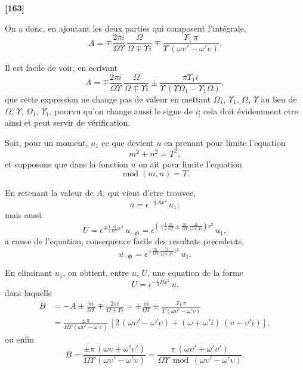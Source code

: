 \documentclass[11pt,a4paper]{article}
\DeclareMathOperator{\modd}{mod}
\begin{document}
\textbf{[163]}

On a donc, en ajoutant les deux parties qui composent l'int\'egrale,
\begin{equation}
A = \mp \frac{2\pi i}{\Omega\Upsilon}\, \frac{\Omega}{\Omega \mp \Upsilon i} \mp \frac{\Upsilon_1\, \pi}{\Upsilon\, (\omega\upsilon' - \omega'\upsilon)}. \tag{14}
\end{equation}

Il est facile de voir, en ecrivant
\[A = \mp \frac{2\pi i}{\Omega\Upsilon}\, \frac{\Omega}{\Omega \mp \Upsilon i} \pm \frac{\pi\Upsilon_1 i}{\Upsilon\, (\Upsilon\Omega_1 - \Upsilon_1\Omega)},\]
que cette expression ne change pas de valeur en mettant $\Omega_1$, $\Upsilon_1$, $\Omega$, $\Upsilon$ au lieu de
$\Omega$, $\Upsilon$, $\Omega_1$, $\Upsilon_1$, pourvu qu'on change aussi le signe de $i$; cela doit \'evidemment etre ainsi
et peut servir de v\'erification.

Soit, pour un moment, $u_1$ ce que devient $u$ en prenant pour limite l'equation
\[m^2 + n^2 = T^2,\]
et supposons que dans la fonction $u$ on ait pour limite l'equation
\[\modd(m, n) = T.\]

En retenant la valeur de $A$, qui vient d'etre trouvee,
\[u = \epsilon^{-\frac{1}{2}Ax^2}\, u_1;\]
mais aussi
\[U = \epsilon^{\mp \frac{1}{2}\frac{\pi i}{\Omega\Upsilon} x^2}\, u_{-\mathfrak{G}}
= \epsilon^{\left(\mp \frac{1}{2}\frac{\pi i}{\Omega\Upsilon} \pm \frac{\pi i}{\Omega\Upsilon}\, \frac{\Omega}{\Omega \mp \Upsilon i}\right) x^2}\, u_1,\]
a cause de l'equation, consequence facile des resultats precedents,
\[u_{-\mathfrak{G}} = \epsilon^{\pm \frac{\pi i}{\Omega\Upsilon}\, \frac{\Omega}{\Omega \mp \Upsilon i} x^2}\, u_1.\]

En eliminant $u_1$, on obtient, entre $u$, $U$, une equation de la forme
\begin{equation}
U = \epsilon^{-\frac{1}{2}Bx^2}\, u. \tag{15}
\end{equation}
dans laquelle
\begin{align*}
B &= -A \pm \frac{\pi i}{\Omega\Upsilon} \mp \frac{2\pi i}{\Omega \mp \Upsilon i}
= \pm \frac{\pi i}{\Omega\Upsilon} \pm \frac{\Upsilon_1\, \pi}{\Upsilon\, (\omega\upsilon' - \omega'\upsilon)}\\
&= \frac{\pm\pi}{\Omega\Upsilon\, (\omega\upsilon' - \omega'\upsilon)}\, [2\, (\omega\upsilon' - \omega'\upsilon) + (\omega + \omega'i)\, (\upsilon - \upsilon'i)],
\end{align*}
ou enfin
\begin{equation}
B = \frac{\pm\pi\, (\omega\upsilon + \omega'\upsilon')}{\Omega\Upsilon\, (\omega\upsilon' - \omega'\upsilon)}
= \frac{\pi\, (\omega\upsilon' + \omega'\upsilon')}{\Omega\Upsilon\, \modd\, (\omega\upsilon' - \omega'\upsilon)}. \tag{16}
\end{equation}
\end{document}
